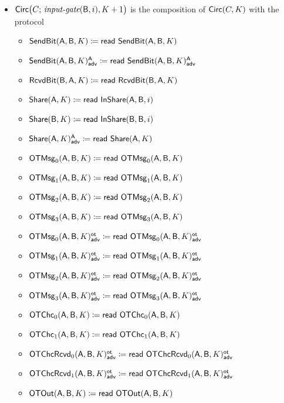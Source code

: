 \begin{itemize}
\item $\Circ\big(C; \, \inputgate(\B,i),K+1\big)$ is the composition of $\Circ(C,K)$ with the protocol
\begin{itemize}
\item $\SendBit(\A,\B,K) \coloneqq \read{\SendBit(\A,\B,K)}$
\item {\color{blue} $\LeakSendBit(\A,\B,K)^\A_\adv \coloneqq \read{\LeakSendBit(\A,\B,K)^\A_\adv}$}\smallskip
\item $\RcvdBit(\B,\A,K) \coloneqq \read{\RcvdBit(\B,\A,K)}$\smallskip
\item $\Share(\A,K) \coloneqq \read{\InShare(\A,\B,i)}$
\item $\Share(\B,K) \coloneqq \read{\InShare(\B,\B,i)}$
\item {\color{blue} $\LeakShare(\A,K)^\A_\adv \coloneqq \read{\Share(\A,K)}$}\smallskip
\item $\OTMsg_0(\A,\B,K) \coloneqq \read{\OTMsg_0(\A,\B,K)}$
\item $\OTMsg_1(\A,\B,K) \coloneqq \read{\OTMsg_1(\A,\B,K)}$
\item $\OTMsg_2(\A,\B,K) \coloneqq \read{\OTMsg_2(\A,\B,K)}$
\item $\OTMsg_3(\A,\B,K) \coloneqq \read{\OTMsg_3(\A,\B,K)}$\smallskip
\item {\color{blue} $\LeakOTMsg_0(\A,\B,K)^\ot_\adv \coloneqq \read{\LeakOTMsg_0(\A,\B,K)^\ot_\adv}$}
\item {\color{blue} $\LeakOTMsg_1(\A,\B,K)^\ot_\adv \coloneqq \read{\LeakOTMsg_1(\A,\B,K)^\ot_\adv}$}
\item {\color{blue} $\LeakOTMsg_2(\A,\B,K)^\ot_\adv \coloneqq \read{\LeakOTMsg_2(\A,\B,K)^\ot_\adv}$}
\item {\color{blue} $\LeakOTMsg_3(\A,\B,K)^\ot_\adv \coloneqq \read{\LeakOTMsg_3(\A,\B,K)^\ot_\adv}$}\smallskip
\item $\OTChc_0(\A,\B,K) \coloneqq \read{\OTChc_0(\A,\B,K)}$
\item $\OTChc_1(\A,\B,K) \coloneqq \read{\OTChc_1(\A,\B,K)}$\smallskip
\item {\color{blue} $\LeakOTChcRcvd_0(\A,\B,K)^\ot_\adv \coloneqq \read{\LeakOTChcRcvd_0(\A,\B,K)^\ot_\adv}$}
\item {\color{blue} $\LeakOTChcRcvd_1(\A,\B,K)^\ot_\adv \coloneqq \read{\LeakOTChcRcvd_1(\A,\B,K)^\ot_\adv}$}\smallskip
\item $\OTOut(\A,\B,K) \coloneqq \read{\OTOut(\A,\B,K)}$
\end{itemize}


\end{itemize}
